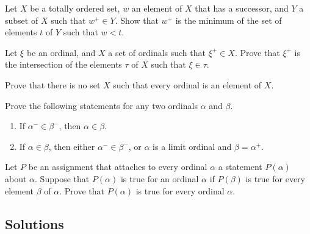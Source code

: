 \documentclass{article}
\begin{document}
\begin{exercise}
  \label{exe:ylp1zcc8}
  Let \(X\) be a totally ordered set, \(w\) an element of \(X\) that
  has a successor, and \(Y\) a subset of \(X\) such that
  \(w^+ \in Y\).  Show that \(w^+\) is the minimum of the set of
  elements \(t\) of \(Y\) such that \(w < t\).
\end{exercise}

\begin{exercise}
  \label{exe:ddc4bdfk}
  Let \(\xi\) be an ordinal, and \(X\) a set of ordinals such that
  \(\xi^+ \in X\).  Prove that \(\xi^+\) is the intersection of the
  elements \(\tau\) of \(X\) such that \(\xi \in \tau\).
\end{exercise}

\begin{exercise}
  \label{exe:9pk4eh7k}
  Prove that there is no set \(X\) such that every ordinal is an
  element of \(X\).
\end{exercise}

\begin{exercise}
  \label{exe:7tvca54w}
  Prove the following statements for any two ordinals \(\alpha\) and
  \(\beta\).
  \begin{enumerate}
  \item If \(\alpha^- \in \beta^-\), then \(\alpha \in \beta\).
  \item If \(\alpha \in \beta\), then either \(\alpha^- \in \beta^-\),
    or \(\alpha\) is a limit ordinal and \(\beta = \alpha^+\).
  \end{enumerate}
\end{exercise}

\begin{exercise}
  \label{exe:jxzsy88l}
  Let \(P\) be an assignment that attaches to every ordinal \(\alpha\)
  a statement \(P(\alpha)\) about \(\alpha\).  Suppose that
  \(P(\alpha)\) is true for an ordinal \(\alpha\) if \(P(\beta)\) is
  true for every element \(\beta\) of \(\alpha\).  Prove that
  \(P(\alpha)\) is true for every ordinal \(\alpha\).
\end{exercise}

\subsection{Solutions}
\label{sec:fzhm4l61}
\end{document}
